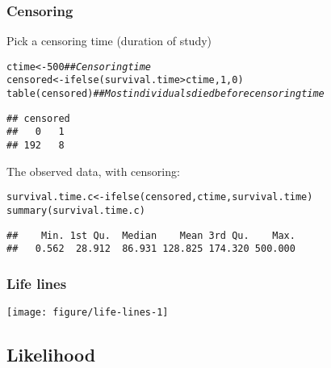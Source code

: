 \documentclass[color=usenames,dvipsnames]{beamer}\usepackage[]{graphicx}\usepackage[]{xcolor}
\makeatletter
\newcommand{\hlnum}[1]{\textcolor[rgb]{0.69,0.494,0}{#1}}%
\newcommand{\hlcom}[1]{\textcolor[rgb]{0.514,0.506,0.514}{\textit{#1}}}%
\newcommand{\hlopt}[1]{\textcolor[rgb]{0,0,0}{#1}}%
\newcommand{\hldef}[1]{\textcolor[rgb]{0,0,0}{#1}}%
\newcommand{\hlkwb}[1]{\textcolor[rgb]{0,0.341,0.682}{#1}}%
\newcommand{\hlkwd}[1]{\textcolor[rgb]{0.004,0.004,0.506}{#1}}%
\newenvironment{kframe}{%
 \def\at@end@of@kframe{}%
 \ifinner\ifhmode%
  \def\at@end@of@kframe{\end{minipage}}%
  \begin{minipage}{\columnwidth}%
 \fi\fi%
 \def\FrameCommand##1{\hskip\@totalleftmargin \hskip-\fboxsep
 \colorbox{shadecolor}{##1}\hskip-\fboxsep
     \hskip-\linewidth \hskip-\@totalleftmargin \hskip\columnwidth}%
 \MakeFramed {\advance\hsize-\width
   \@totalleftmargin\z@ \linewidth\hsize
   \@setminipage}}%
 {\par\unskip\endMakeFramed%
 \at@end@of@kframe}
\newenvironment{knitrout}{}{} %
\makeatother
\begin{document}
\begin{frame}[fragile]
  \frametitle{Censoring}
  Pick a censoring time (duration of study)
\begin{knitrout}\footnotesize
{}\color{fgcolor}\begin{kframe}
\begin{alltt}
\hldef{ctime} \hlkwb{<-} \hlnum{500}    \hlcom{## Censoring time}
\hldef{censored} \hlkwb{<-} \hlkwd{ifelse}\hldef{(survival.time}\hlopt{>}\hldef{ctime,} \hlnum{1}\hldef{,} \hlnum{0}\hldef{)}
\hlkwd{table}\hldef{(censored)} \hlcom{## Most individuals died before censoring time}
\end{alltt}
\begin{verbatim}
## censored
##   0   1 
## 192   8
\end{verbatim}
\end{kframe}
\end{knitrout}
\pause
\vfill
The observed data, with censoring:
\begin{knitrout}\footnotesize
{}\color{fgcolor}\begin{kframe}
\begin{alltt}
\hldef{survival.time.c} \hlkwb{<-} \hlkwd{ifelse}\hldef{(censored, ctime, survival.time)}
\hlkwd{summary}\hldef{(survival.time.c)}
\end{alltt}
\begin{verbatim}
##    Min. 1st Qu.  Median    Mean 3rd Qu.    Max. 
##   0.562  28.912  86.931 128.825 174.320 500.000
\end{verbatim}
\end{kframe}
\end{knitrout}
\end{frame}




\begin{frame}[fragile]
  \frametitle{Life lines}
\begin{knitrout}\footnotesize
{}\color{fgcolor}

{\centering \texttt{[image: figure/life-lines-1]} 

}


\end{knitrout}
\end{frame}




\subsection{Likelihood}
\end{document}
